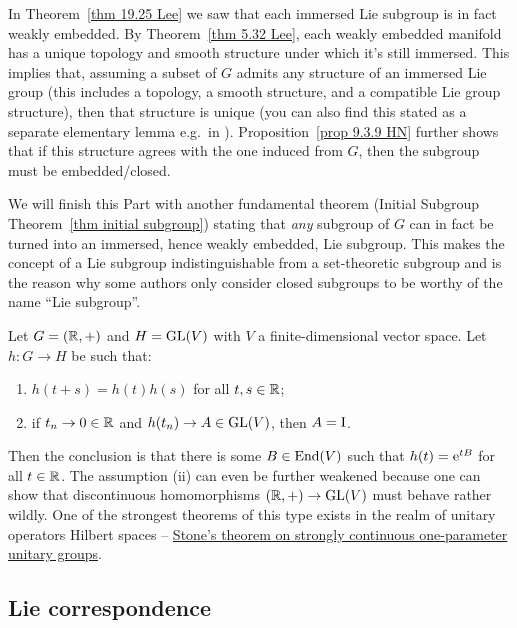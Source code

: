 \begin{rem}\label{rem structure of Lie subgroups}
    In Theorem~\ref{thm 19.25 Lee} we saw that each immersed Lie subgroup is in fact weakly embedded. By Theorem~\ref{thm 5.32 Lee}, each weakly embedded manifold has a unique topology and smooth structure under which it's still immersed. This implies that, assuming a subset of $G$ admits any structure of an immersed Lie group (this includes a topology, a smooth structure, and a compatible Lie group structure), then that structure is unique (you can also find this stated as a separate elementary lemma e.g.~in \cite[Lem.~9.6.12]{HN}). Proposition~\ref{prop 9.3.9 HN} further shows that if this structure agrees with the one induced from $G$, then the subgroup must be embedded/closed. 
    
    We will finish this Part with another fundamental theorem (Initial Subgroup Theorem~\ref{thm initial subgroup}) stating that \emph{any} subgroup of $G$ can in fact be turned into an immersed, hence weakly embedded, Lie subgroup. This makes the concept of a Lie subgroup indistinguishable from a set-theoretic subgroup and is the reason why some authors only consider closed subgroups to be worthy of the name ``Lie subgroup''.
\end{rem}


\begin{example}
    Let $G=(\mathbb{R},+)$ and $H=\operatorname{GL}(V)$ with $V$ a finite-dimensional vector space. Let $h:G\to H$ be such that:
    \begin{enumerate}[label=(\roman*)]
        \item $h(t+s)=h(t)h(s)$ for all $t,s\in\mathbb{R}$;
        \item if $t_n\to 0\in\mathbb{R}$ and $h(t_n)\to A\in\operatorname{GL}(V)$, then $A=\mathrm{I}$.
    \end{enumerate}
    Then the conclusion is that there is some $B\in \operatorname{End}(V)$ such that $h(t)=\mathrm{e}^{tB}$ for all $t\in \mathbb{R}$. The assumption (ii) can even be further weakened because one can show that discontinuous homomorphisms $(\mathbb{R},+)\to \operatorname{GL}(V)$ must behave rather wildly. One of the strongest theorems of this type exists in the realm of unitary operators Hilbert spaces -- \href{https://en.wikipedia.org/wiki/Stone%27s_theorem_on_one-parameter_unitary_groups}{Stone's theorem on strongly continuous one-parameter unitary groups}.
\end{example}






\subsection{Lie correspondence}\label{sec: Lie III}

